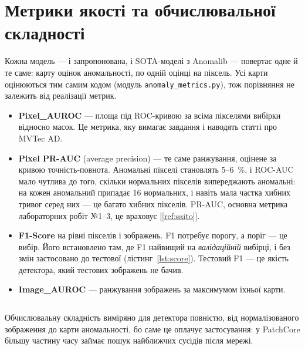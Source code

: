 \documentclass[14pt,a4paper]{extreport}
\begin{document}
\inputminted[firstline=287,lastline=316]{python}{../src/mk1/feature_ae.py}
\label{lst:fit}

\section{Метрики якості та обчислювальної складності}
\label{sec:metrics}

Кожна модель --- і запропонована, і SOTA-моделі з Anomalib --- повертає одне й те саме: карту оцінок аномальності, по одній оцінці на піксель. Усі карти оцінюються тим самим кодом (модуль \texttt{anomaly\_metrics.py}), тож порівняння не залежить від реалізації метрик.

\begin{itemize}
\item \textbf{Pixel\_AUROC} --- площа під ROC-кривою за всіма пікселями вибірки відносно масок. Це метрика, яку вимагає завдання і наводять статті про MVTec AD.
\item \textbf{Pixel PR-AUC} (average precision) --- те саме ранжування, оцінене за кривою точність-повнота. Аномальні пікселі становлять 5--6~\%, і ROC-AUC мало чутлива до того, скільки нормальних пікселів випереджають аномальні: на кожен аномальний припадає 16 нормальних, і навіть мала частка хибних тривог серед них --- це багато хибних пікселів. PR-AUC, основна метрика лабораторних робіт №1--3, це враховує [\ref{ref:saito}].
\item \textbf{F1-Score} на рівні пікселів і зображень. F1 потребує порогу, а поріг --- це вибір. Його встановлено там, де F1 найвищий на \emph{валідаційній} вибірці, і без змін застосовано до тестової (лістинг~\ref{lst:score}). Тестовий F1 --- це якість детектора, який тестових зображень не бачив.
\item \textbf{Image\_AUROC} --- ранжування зображень за максимумом їхньої карти.
\end{itemize}

\inputminted[firstline=105,lastline=120]{python}{../src/mk1/anomaly_metrics.py}
\label{lst:score}

Обчислювальну складність виміряно для детектора повністю, від нормалізованого зображення до карти аномальності, бо саме це оплачує застосування: у PatchCore більшу частину часу займає пошук найближчих сусідів після мережі.
\end{document}
